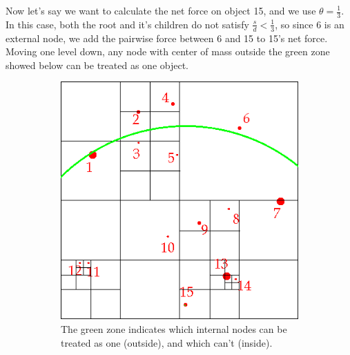 Now let's say we want to calculate the net force on object 15, and we use $\theta = \frac{1}{3}$. In this case, both the root and it's children do not satisfy $\frac{s}{d} < \frac{1}{3}$, so since 6 is an external node, we add the pairwise force between 6 and 15 to 15's net force. Moving one level down, any node with center of mass outside the green zone showed below can be treated as one object.
\begin{figure}[ht]
\centering
\begin{subfigure}{0.24\textwidth}
\includegraphics[width=\textwidth]{barneshut_map_green_2.png}
\caption{The green zone indicates which internal nodes can be treated as one (outside), and which can't (inside).}
\end{subfigure}\hspace{1cm}
\begin{subfigure}{0.24\textwidth}

\end{subfigure}
\end{figure}
